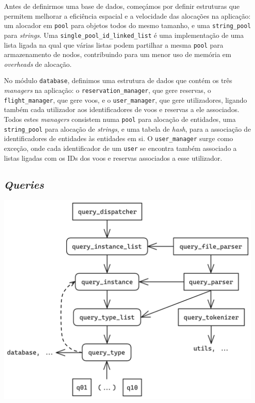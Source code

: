 \documentclass[12pt, a4paper]{article}
\begin{document}
Antes de definirmos uma base de dados, começámos por definir estruturas que permitem melhorar a
eficiência espacial e a velocidade das alocações na aplicação: um alocador em \texttt{pool} para
objetos todos do mesmo tamanho, e uma \texttt{string\_pool} para \emph{strings}. Uma
\texttt{single\_pool\_id\_linked\_list} é uma implementação de uma lista ligada na qual que várias
listas podem partilhar a mesma \texttt{pool} para armazenamento de nodos, contribuindo para um
menor uso de memória em \emph{overheads} de alocação.

No módulo \texttt{database}, definimos uma estrutura de dados que contém os três \emph{managers} na
aplicação: o \texttt{reservation\_manager}, que gere reservas, o \texttt{flight\_manager}, que gere
voos, e o \texttt{user\_manager}, que gere utilizadores, ligando também cada utilizador aos
identificadores de voos e reservas a ele associados. Todos estes \emph{managers} consistem numa
\texttt{pool} para alocação de entidades, uma \texttt{string\_pool} para alocação de \emph{strings},
e uma tabela de \emph{hash}, para a associação de identificadores de entidades às entidades em si.
O \texttt{user\_manager} surge como exceção, onde cada identificador de um \texttt{user} se
encontra também associado a listas ligadas com os IDs dos voos e reservas associados a esse
utilizador.

\subsection{\emph{Queries}}

\begin{center}
    \includegraphics[scale=0.19]{res/queries.png}
\end{center}
\end{document}
